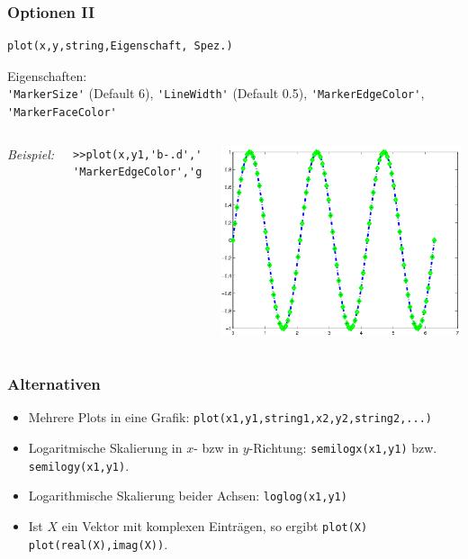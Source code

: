 % 
% 
\begin{frame}[fragile]\frametitle{Optionen II}
\begin{lstlisting}
plot(x,y,string,Eigenschaft, Spez.) 
\end{lstlisting}
\alert{ Eigenschaften:}\\
\lstinline!'MarkerSize'! (Default 6), \lstinline!'LineWidth'! (Default 0.5),
\lstinline!'MarkerEdgeColor'!, \lstinline!'MarkerFaceColor'!\\

\begin{columns}[c]
{\it Beispiel:} \\
\begin{lstlisting}
>>plot(x,y1,'b-.d','LineWidth',3,...
'MarkerEdgeColor','g')
\end{lstlisting}
\includegraphics[width=\textwidth]{./figures/grafik_3}
\end{columns}
\end{frame}
% 
% 
\begin{frame}[fragile]\frametitle{Alternativen}
\begin{itemize}
\item Mehrere Plots in eine Grafik:
\alert{ \lstinline!plot(x1,y1,string1,x2,y2,string2,...)!}
\item Logaritmische Skalierung in $x$- bzw in $y$-Richtung: \alert{ \lstinline!semilogx(x1,y1)!} bzw. \alert{
  \lstinline!semilogy(x1,y1)!}.
\item Logarithmische Skalierung beider Achsen: \alert{
  \lstinline!loglog(x1,y1)!}   
\item Ist $X$ ein Vektor mit komplexen Einträgen, so ergibt \alert{
  \lstinline!plot(X)!} \lstinline!plot(real(X),imag(X))!.
\end{itemize}
\end{frame}
